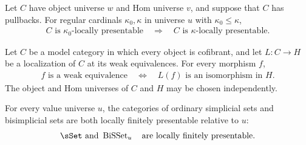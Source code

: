 \begin{resultblock}
\begin{proposition}
Let $C$ have object universe $w$ and Hom universe $v$, and suppose that $C$ has pullbacks.
For regular cardinals $\kappa_0,\kappa$ in universe $u$ with $\kappa_0\leq\kappa$,
\begin{align}
C\text{ is }\kappa_0\text{-locally presentable}
  \quad\Longrightarrow\quad
C\text{ is }\kappa\text{-locally presentable}.
\end{align}
\end{proposition}
\end{resultblock}

\begin{resultblock}
\begin{theorem}
Let $C$ be a model category in which every object is cofibrant, and let $L:C\to H$ be a localization of $C$ at its weak equivalences.
For every morphism $f$,
\begin{align}
f\text{ is a weak equivalence}
  \quad\Longleftrightarrow\quad
L(f)\text{ is an isomorphism in }H.
\end{align}
The object and Hom universes of $C$ and $H$ may be chosen independently.
\end{theorem}
\end{resultblock}

\begin{resultblock}
\begin{proposition}
For every value universe $u$, the categories of ordinary simplicial sets and bisimplicial sets are both locally finitely presentable relative to $u$:
\begin{align}
\sSet\text{ and }\operatorname{BiSSet}_u
  \quad\text{are locally finitely presentable}.
\end{align}
\end{proposition}
\end{resultblock}

